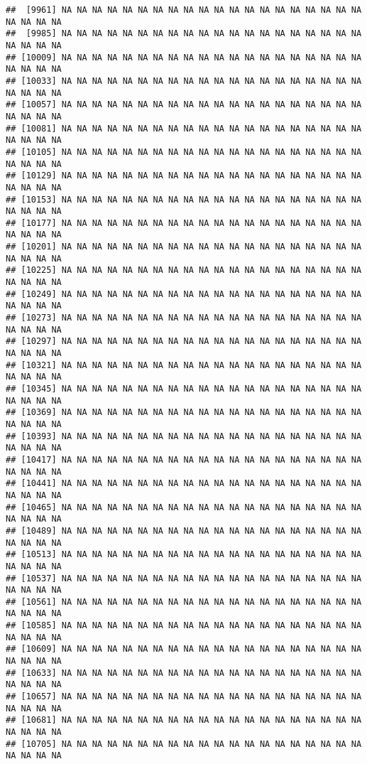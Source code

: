 \documentclass[
]{article}
\begin{document}
\begin{verbatim}
##  [9961] NA NA NA NA NA NA NA NA NA NA NA NA NA NA NA NA NA NA NA NA NA NA NA NA
##  [9985] NA NA NA NA NA NA NA NA NA NA NA NA NA NA NA NA NA NA NA NA NA NA NA NA
## [10009] NA NA NA NA NA NA NA NA NA NA NA NA NA NA NA NA NA NA NA NA NA NA NA NA
## [10033] NA NA NA NA NA NA NA NA NA NA NA NA NA NA NA NA NA NA NA NA NA NA NA NA
## [10057] NA NA NA NA NA NA NA NA NA NA NA NA NA NA NA NA NA NA NA NA NA NA NA NA
## [10081] NA NA NA NA NA NA NA NA NA NA NA NA NA NA NA NA NA NA NA NA NA NA NA NA
## [10105] NA NA NA NA NA NA NA NA NA NA NA NA NA NA NA NA NA NA NA NA NA NA NA NA
## [10129] NA NA NA NA NA NA NA NA NA NA NA NA NA NA NA NA NA NA NA NA NA NA NA NA
## [10153] NA NA NA NA NA NA NA NA NA NA NA NA NA NA NA NA NA NA NA NA NA NA NA NA
## [10177] NA NA NA NA NA NA NA NA NA NA NA NA NA NA NA NA NA NA NA NA NA NA NA NA
## [10201] NA NA NA NA NA NA NA NA NA NA NA NA NA NA NA NA NA NA NA NA NA NA NA NA
## [10225] NA NA NA NA NA NA NA NA NA NA NA NA NA NA NA NA NA NA NA NA NA NA NA NA
## [10249] NA NA NA NA NA NA NA NA NA NA NA NA NA NA NA NA NA NA NA NA NA NA NA NA
## [10273] NA NA NA NA NA NA NA NA NA NA NA NA NA NA NA NA NA NA NA NA NA NA NA NA
## [10297] NA NA NA NA NA NA NA NA NA NA NA NA NA NA NA NA NA NA NA NA NA NA NA NA
## [10321] NA NA NA NA NA NA NA NA NA NA NA NA NA NA NA NA NA NA NA NA NA NA NA NA
## [10345] NA NA NA NA NA NA NA NA NA NA NA NA NA NA NA NA NA NA NA NA NA NA NA NA
## [10369] NA NA NA NA NA NA NA NA NA NA NA NA NA NA NA NA NA NA NA NA NA NA NA NA
## [10393] NA NA NA NA NA NA NA NA NA NA NA NA NA NA NA NA NA NA NA NA NA NA NA NA
## [10417] NA NA NA NA NA NA NA NA NA NA NA NA NA NA NA NA NA NA NA NA NA NA NA NA
## [10441] NA NA NA NA NA NA NA NA NA NA NA NA NA NA NA NA NA NA NA NA NA NA NA NA
## [10465] NA NA NA NA NA NA NA NA NA NA NA NA NA NA NA NA NA NA NA NA NA NA NA NA
## [10489] NA NA NA NA NA NA NA NA NA NA NA NA NA NA NA NA NA NA NA NA NA NA NA NA
## [10513] NA NA NA NA NA NA NA NA NA NA NA NA NA NA NA NA NA NA NA NA NA NA NA NA
## [10537] NA NA NA NA NA NA NA NA NA NA NA NA NA NA NA NA NA NA NA NA NA NA NA NA
## [10561] NA NA NA NA NA NA NA NA NA NA NA NA NA NA NA NA NA NA NA NA NA NA NA NA
## [10585] NA NA NA NA NA NA NA NA NA NA NA NA NA NA NA NA NA NA NA NA NA NA NA NA
## [10609] NA NA NA NA NA NA NA NA NA NA NA NA NA NA NA NA NA NA NA NA NA NA NA NA
## [10633] NA NA NA NA NA NA NA NA NA NA NA NA NA NA NA NA NA NA NA NA NA NA NA NA
## [10657] NA NA NA NA NA NA NA NA NA NA NA NA NA NA NA NA NA NA NA NA NA NA NA NA
## [10681] NA NA NA NA NA NA NA NA NA NA NA NA NA NA NA NA NA NA NA NA NA NA NA NA
## [10705] NA NA NA NA NA NA NA NA NA NA NA NA NA NA NA NA NA NA NA NA NA NA NA NA

\end{verbatim}
\end{document}
